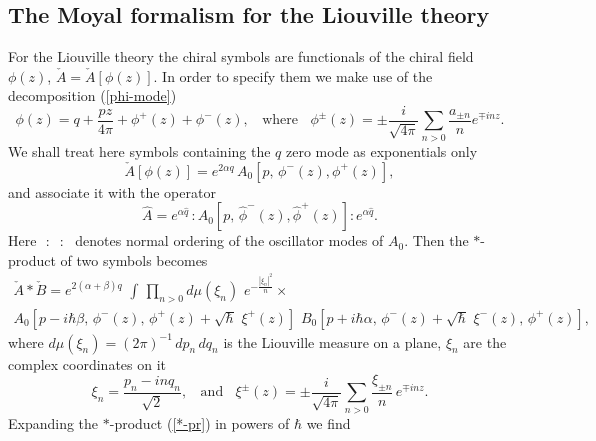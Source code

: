 \documentclass[a4paper,12pt]{article}
\begin{document}
\subsection{The Moyal formalism for the Liouville theory}

For the Liouville theory the chiral symbols are functionals of the chiral
field $\phi(z)$, ${\check A}={\check A}[\phi(z)]$. In order to
specify them we make use of the
decomposition (\ref{phi-mode})
\begin{equation}\label{phi-decomp}
\phi (z)= q+
\frac{pz}{4\pi}+\phi^{+}(z)+\phi^{-}(z),~~~~\mbox{where}~~~~
\phi^{\pm}(z)= \pm \frac{i}{\sqrt{4\pi}}\sum_{n>0}
\frac{a_{\pm n}}{n}e^{\mp inz}.
\end{equation}
We shall treat here symbols containing the $q$ zero mode as
exponentials only
\begin{equation}\label{symbol}
{\check A[\phi(z)]}=e^{2\alpha q}\,{ A_0}[p,\,\phi^-(z),\phi^+(z)],
\end{equation}
and associate it with the operator
\begin{equation}\label{op-symbol}
{\hat A}=
e^{\alpha\hat q}\,:{A_0}[p,\,\hat\phi^-(z),\hat\phi^+(z)]:e^{\alpha\hat q}.
\end{equation}
Here $\,\,:~\,\,:\,\,$ denotes normal ordering of the oscillator
modes of $ A_0$.
Then the $*$-product of two symbols becomes
\begin{eqnarray}\label{*-pr}
{\check A} *{\check B} = e^{2(\alpha+\beta )q}\,\,
\int\,\prod_{n>0} d\mu(\xi_n) \,\,e^{-\frac{|\xi_n|^2}{n}}\times\,\,
~~~~~~~~~~~~~~~~~~~~~~~~~~~~~~~~~~~~~~~~~~~~~~
\nonumber \\
{ A_0}[p-i\hbar \beta,\,\phi^-(z),\,\phi^+(z)+\sqrt{\hbar}\,\,\xi^+(z)]
\,\,{ B_0}[p+i\hbar \alpha,\,\phi^-(z)+\sqrt{\hbar}\,\,\xi^-(z),\, \phi^+(z)],
\end{eqnarray}
where $d\mu(\xi_n)=(2\pi)^{-1}\,dp_n\,dq_n$ is the Liouville
measure on a plane, $\xi_n$ are the complex coordinates on it
\begin{equation}\label{xi-pm}
\xi_n=\frac{p_n-inq_n}{\sqrt 2},
~~~~\mbox{and}~~~~\xi^{\pm}(z)= \pm \frac{i}{\sqrt{4\pi}}\sum_{n>0}
\frac{\xi_{\pm n}}{n}\,e^{\mp inz}.
\end{equation}
Expanding the $*$-product (\ref{*-pr}) in powers of $\hbar$ we find
\end{document}
